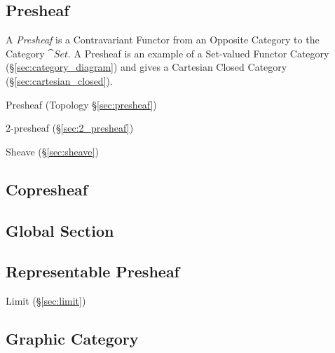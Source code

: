 \subsection{Presheaf}\label{sec:category_presheaf}

A \emph{Presheaf} is a Contravariant Functor from an Opposite Category
to the Category $\cat{Set}$. A Presheaf is an example of a
Set-valued Functor Category (\S\ref{sec:category_diagram}) and gives a
Cartesian Closed Category (\S\ref{sec:cartesian_closed}).

Presheaf (Topology \S\ref{sec:presheaf})

$2$-presheaf (\S\ref{sec:2_presheaf})

Sheave (\S\ref{sec:sheave})



\subsection{Copresheaf}\label{sec:copresheaf}

\subsection{Global Section}\label{sec:global_section}

\subsection{Representable Presheaf}\label{sec:representable_presheaf}

Limit (\S\ref{sec:limit})



\subsection{Graphic Category}\label{sec:graphic_category}

